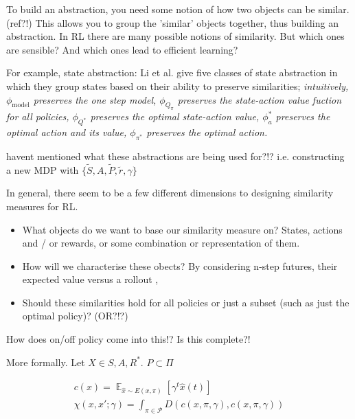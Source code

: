 To build an abstraction, you need some notion of how two objects can be similar. (ref?!)
This allows you to group the 'similar' objects together, thus building an abstraction.
In RL there are many possible notions of similarity. But which ones are sensible?
And which ones lead to efficient learning?

\vspace{5mm}

For example, state abstraction: Li et al. \cite{Littman2006} give five classes of
state abstraction in which they group states based on their ability to preserve similarities;
\textit{intuitively,
$\phi_{\text{model}}$ preserves the one step model,
$\phi_{Q_{\pi}}$ preserves the state-action value fuction for all policies,
$\phi_{Q^{* }}$ preserves the optimal state-action value,
$\phi_a^{* }$ preserves the optimal action and its value,
$\phi_{\pi^{* }}$ preserves the optimal action.}

{\color{red}havent mentioned what these abstractions are being used for?!?}
i.e. constructing a new MDP with $\{\tilde S, A, \tilde P, \tilde r, \gamma\}$

In general, there seem to be a few different dimensions to designing similarity measures for RL.

\begin{itemize}
  \tightlist
  \item What objects do we want to base our similarity measure on? States, actions and / or rewards, or some combination or representation of them.
  \item How will we characterise these obects? By considering n-step futures, their expected value versus a rollout \footnotemark[9],
  \item Should these similarities hold for all policies or just a subset (such as just the optimal policy)? (OR?!?)
\end{itemize}


{\color{red}How does on/off policy come into this!? Is this complete?!}

More formally. Let $X \in {S, A, R}^{* }$. $P \subset \Pi$

\begin{align*}
c(x) = \mathop{\mathbb E}_{\hat x \sim E(x, \pi)} [\gamma^t \hat x(t)] \\
\chi(x, x'; \gamma) = \int_{\pi \in \mathcal P} D(c(x, \pi, \gamma), c(x, \pi, \gamma))
\end{align*}

